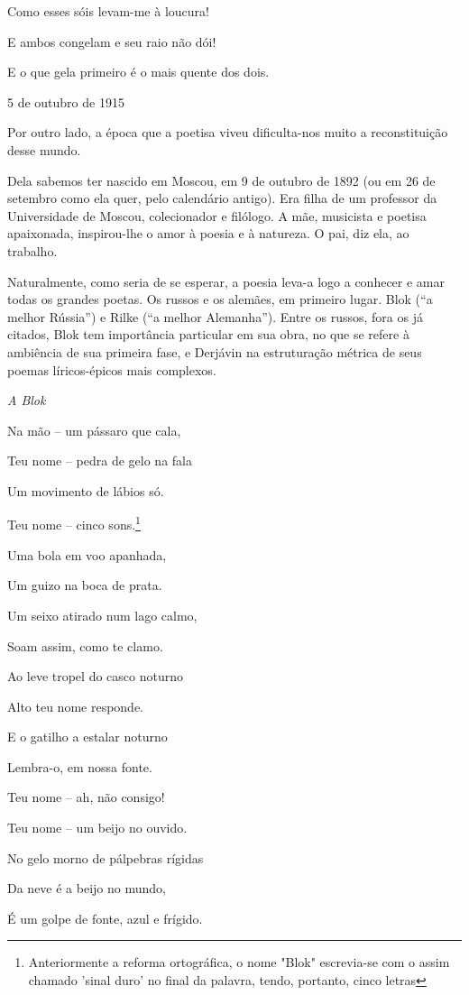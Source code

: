 Como esses sóis levam-me à loucura!

E ambos congelam e seu raio não dói!

E o que gela primeiro é o mais quente dos dois.

5 de outubro de 1915

Por outro lado, a época que a poetisa viveu dificulta-nos muito a
reconstituição desse mundo.

Dela sabemos ter nascido em Moscou, em 9 de outubro de 1892 (ou em 26 de
setembro como ela quer, pelo calendário antigo). Era filha de um
professor da Universidade de Moscou, colecionador e filólogo. A mãe,
musicista e poetisa apaixonada, inspirou-lhe o amor à poesia e à
natureza. O pai, diz ela, ao trabalho.

Naturalmente, como seria de se esperar, a poesia leva-a logo a conhecer
e amar todas os grandes poetas. Os russos e os alemães, em primeiro
lugar. Blok (``a melhor Rússia'') e Rilke (``a melhor Alemanha''). Entre
os russos, fora os já citados, Blok tem importância particular em sua
obra, no que se refere à ambiência de sua primeira fase, e Derjávin na
estruturação métrica de seus poemas líricos-épicos mais complexos.

\emph{A Blok}

Na mão -- um pássaro que cala,

Teu nome -- pedra de gelo na fala

Um movimento de lábios só.

Teu nome -- cinco sons.\footnote{Anteriormente a reforma ortográfica, o
  nome "Blok" escrevia-se com o assim chamado 'sinal duro' no final da
  palavra, tendo, portanto, cinco letras}

Uma bola em voo apanhada,

Um guizo na boca de prata.

Um seixo atirado num lago calmo,

Soam assim, como te clamo.

Ao leve tropel do casco noturno

Alto teu nome responde.

E o gatilho a estalar noturno

Lembra-o, em nossa fonte.

Teu nome -- ah, não consigo!

Teu nome -- um beijo no ouvido.

No gelo morno de pálpebras rígidas

Da neve é a beijo no mundo,

É um golpe de fonte, azul e frígido.

